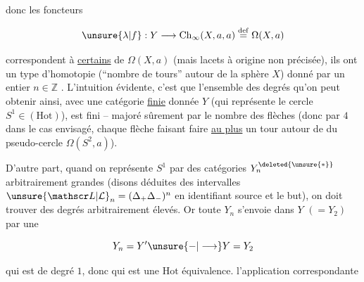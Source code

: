 

donc les foncteurs

\[
\unsure{\lambda|f}:Y\longrightarrow\mathrm{Ch}_\infty(X,a,a)\overset{\mathrm{def}}{=}\Omega(X,a)
\]

correspondent à \uline{certains}   de $\Omega(X,a)$ (mais lacets à origine non précisée), ils ont un type d'homotopie  (``nombre de tours'' autour de la sphère $X$) donné par un entier $n\in\mathbb Z$ . L'intuition évidente, c'est que l'ensemble des degrés \inserted{$\delta$} qu'on peut obtenir ainsi, avec une catégorie \uline{finie} donnée $Y$ (qui représente  le cercle $S^1\in(\mathrm{Hot})$), est fini -- \inserted{\unsure{$\lvert\delta\rvert$|!!}} majoré  sûrement par le nombre des  flèches (donc  par $4$ dans le cas envisagé, chaque flèche  faisant faire \uline{au plus} un tour autour de  du pseudo-cercle $\Omega(S^2,a)$).


D'autre part, quand on représente $S^1$ par des catégories $Y_n^{\deleted{\unsure{*}}}$  arbitrairement grandes (disons déduites des \deleted{\unsure{\Omega}} intervalles $\unsure{\mathscr L|\mathcal L}_n=(\Delta_+\Delta_-)^n$ en identifiant   source et le but), on doit trouver des degrés arbitrairement élevés. Or toute $Y_n$ s'envoie dans $Y$ $(=Y_2)$ par une  

\[
Y_n=Y'\unsure{-|\longrightarrow}Y=Y_2
\]


qui est de degré $1$, donc qui est une $\mathrm{Hot}$ équivalence.   l'application correspondante

